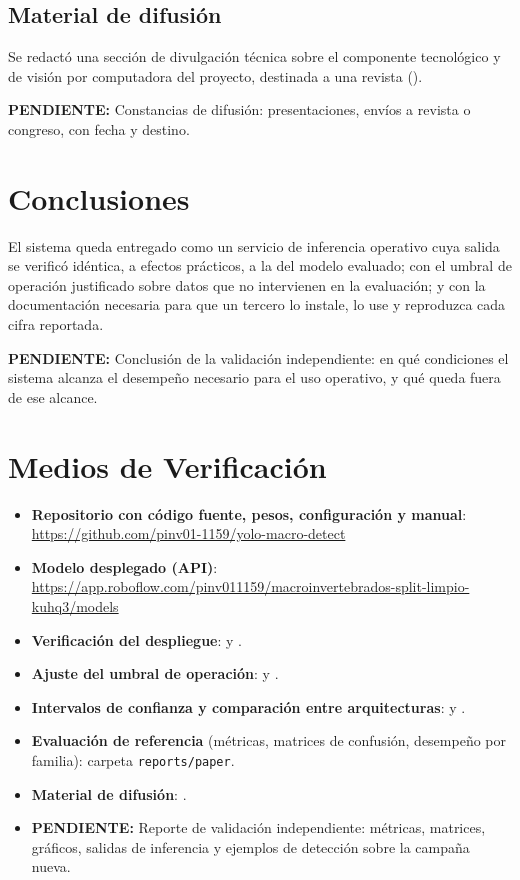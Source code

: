 \documentclass[onecolumn]{article}
\newcommand{\pendiente}[1]{\colorbox{yellow!40}{\parbox{0.95\linewidth}{\small\textbf{PENDIENTE:} #1}}}
\begin{document}
\subsection{Material de difusión}

Se redactó una sección de divulgación técnica sobre el componente tecnológico y de visión por computadora del proyecto, destinada a una revista ().

\pendiente{Constancias de difusión: presentaciones, envíos a revista o congreso, con fecha y destino.}

\section{Conclusiones}

El sistema queda entregado como un servicio de inferencia operativo cuya salida se verificó idéntica, a efectos prácticos, a la del modelo evaluado; con el umbral de operación justificado sobre datos que no intervienen en la evaluación; y con la documentación necesaria para que un tercero lo instale, lo use y reproduzca cada cifra reportada.

\pendiente{Conclusión de la validación independiente: en qué condiciones el sistema alcanza el desempeño necesario para el uso operativo, y qué queda fuera de ese alcance.}

\section{Medios de Verificación}

\begin{itemize}
    \item \textbf{Repositorio con código fuente, pesos, configuración y manual}: \url{https://github.com/pinv01-1159/yolo-macro-detect}
    \item \textbf{Modelo desplegado (API)}: \url{https://app.roboflow.com/pinv011159/macroinvertebrados-split-limpio-kuhq3/models}
    \item \textbf{Verificación del despliegue}:  y .
    \item \textbf{Ajuste del umbral de operación}:  y .
    \item \textbf{Intervalos de confianza y comparación entre arquitecturas}:  y .
    \item \textbf{Evaluación de referencia} (métricas, matrices de confusión, desempeño por familia): carpeta \texttt{reports/paper}.
    \item \textbf{Material de difusión}: .
    \item \pendiente{Reporte de validación independiente: métricas, matrices, gráficos, salidas de inferencia y ejemplos de detección sobre la campaña nueva.}
\end{itemize}
\end{document}

